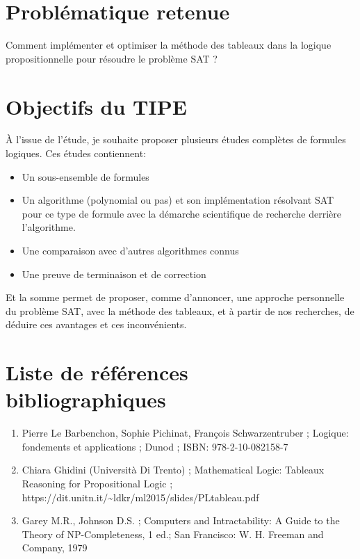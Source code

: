 \documentclass{paper}
\begin{document}
\section{Problématique retenue}
Comment implémenter et optimiser la méthode des tableaux dans la logique propositionnelle pour résoudre le problème SAT ?

\section{Objectifs du TIPE}
À l'issue de l'étude, je souhaite proposer plusieurs études complètes de formules logiques. Ces études contiennent:
\begin{itemize}
    \item Un sous-ensemble de formules
    \item Un algorithme (polynomial ou pas) et son implémentation résolvant SAT pour ce type de formule avec la démarche scientifique de recherche derrière l'algorithme.
    \item Une comparaison avec d'autres algorithmes connus
    \item Une preuve de terminaison et de correction
\end{itemize}
Et la somme permet de proposer, comme d'annoncer, une approche personnelle du problème SAT, avec la méthode des tableaux, et à partir de nos recherches, 
de déduire ces avantages et ces inconvénients.

\section{Liste de références bibliographiques}
\begin{enumerate}
    \item Pierre Le Barbenchon, Sophie Pichinat, François Schwarzentruber ; Logique: fondements et applications ; Dunod ; ISBN: 978-2-10-082158-7
    \item Chiara Ghidini (Università Di Trento) ; Mathematical Logic: Tableaux Reasoning for Propositional Logic ; https://dit.unitn.it/\textasciitilde ldkr/ml2015/slides/PLtableau.pdf
    \item Garey M.R., Johnson D.S. ; Computers and Intractability: A Guide to the Theory of NP-Completeness, 1 ed.; San Francisco: W. H. Freeman and Company, 1979
\end{enumerate}
\end{document}
